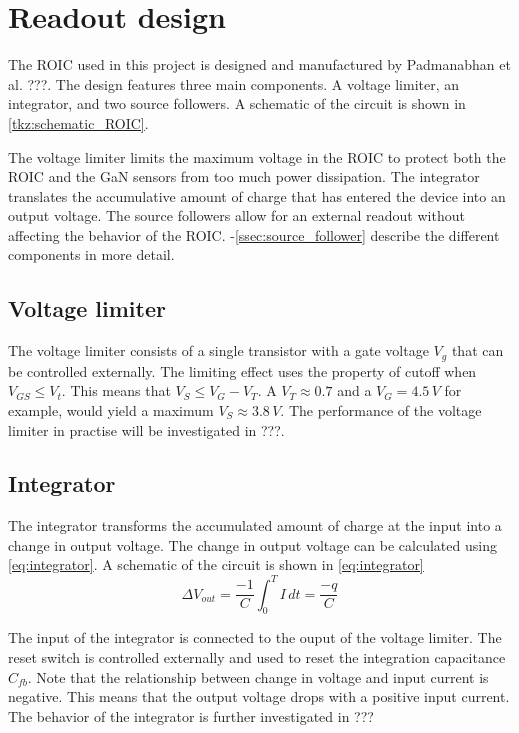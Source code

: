 \section{Readout design}\label{sec:readout_design}
The ROIC used in this project is designed and manufactured by Padmanabhan et al. ???. The design features three main components. A voltage limiter, an integrator, and two source followers. A schematic of the circuit is shown in \cref{tkz:schematic_ROIC}.



The voltage limiter limits the maximum voltage in the ROIC to protect both the ROIC and the GaN sensors from too much power dissipation. The integrator translates the accumulative amount of charge that has entered the device into an output voltage. The source followers allow for an external readout without affecting the behavior of the ROIC. -\ref{ssec:source_follower} describe the different components in more detail.



\subsection{Voltage limiter}\label{ssec:voltage_limiter}
The voltage limiter consists of a single transistor with a gate voltage $V_g$ that can be controlled externally. The limiting effect uses the property of cutoff when $V_{GS}\leq V_t$. This means that $V_S\leq V_G - V_T$. A $V_T\approx0.7$ and a $V_G=4.5\,V$ for example, would yield a maximum $V_S\approx 3.8\,V$. The performance of the voltage limiter in practise will be investigated in ???.

\subsection{Integrator}\label{ssec:integrator}
The integrator transforms the accumulated amount of charge at the input into a change in output voltage. The change in output voltage can be calculated using \cref{eq:integrator}. A schematic of the circuit is shown in \cref{eq:integrator}
\begin{equation}
    \Delta V_{out} = \frac{-1}{C}\int_{0}^{T}I\,dt = \frac{-q}{C} 
    \label{eq:integrator}
\end{equation}



The input of the integrator is connected to the ouput of the voltage limiter. The reset switch is controlled externally and used to reset the integration capacitance $C_{fb}$. Note that the relationship between change in voltage and input current is negative. This means that the output voltage drops with a positive input current. The behavior of the integrator is further investigated in ???

